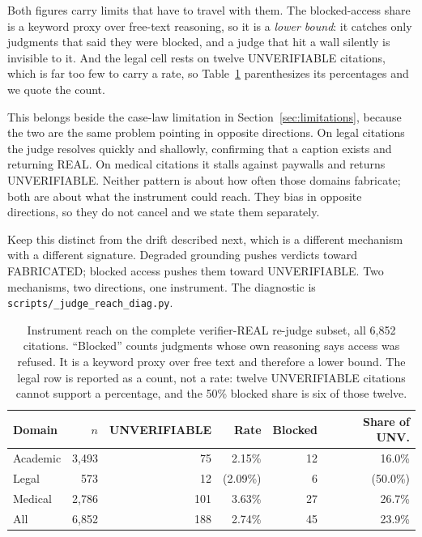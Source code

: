 Both figures carry limits that have to travel with them. The blocked-access share
is a keyword proxy over free-text reasoning, so it is a \emph{lower bound}: it
catches only judgments that said they were blocked, and a judge that hit a wall
silently is invisible to it. And the legal cell rests on twelve UNVERIFIABLE
citations, which is far too few to carry a rate, so Table~\ref{tab:t8}
parenthesizes its percentages and we quote the count.

This belongs beside the case-law limitation in
Section~\ref{sec:limitations}, because the two are the same problem pointing in
opposite directions. On legal citations the judge resolves quickly and shallowly,
confirming that a caption exists and returning REAL. On medical citations it
stalls against paywalls and returns UNVERIFIABLE. Neither pattern is about how
often those domains fabricate; both are about what the instrument could reach.
They bias in opposite directions, so they do not cancel and we state them
separately.

Keep this distinct from the drift described next, which is a different mechanism
with a different signature. Degraded grounding pushes verdicts toward FABRICATED;
blocked access pushes them toward UNVERIFIABLE. Two mechanisms, two directions,
one instrument. The diagnostic is \texttt{scripts/\_judge\_reach\_diag.py}.

\begin{table}[htbp]
\centering
\small
\caption{Instrument reach on the complete verifier-REAL re-judge subset, all
6{,}852 citations. ``Blocked'' counts judgments whose own reasoning says access
was refused. It is a keyword proxy over free text and therefore a lower bound.
The legal row is reported as a count, not a rate: twelve UNVERIFIABLE citations
cannot support a percentage, and the 50\% blocked share is six of those twelve.}
\label{tab:t8}
\begin{tabular}{@{}l r r r r r@{}}
\toprule
Domain & $n$ & UNVERIFIABLE & Rate & Blocked & Share of UNV. \\
\midrule
Academic & 3{,}493 & 75  & 2.15\% & 12 & 16.0\% \\
Legal    & 573     & 12  & (2.09\%) & 6  & (50.0\%) \\
Medical  & 2{,}786 & 101 & 3.63\% & 27 & 26.7\% \\
\midrule
All      & 6{,}852 & 188 & 2.74\% & 45 & 23.9\% \\
\bottomrule
\end{tabular}
\end{table}

